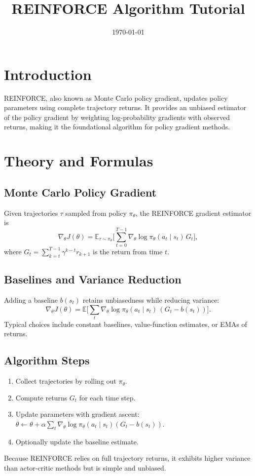 ﻿\documentclass[12pt]{article}
\title{REINFORCE Algorithm Tutorial}
\author{}
\date{\today}
\begin{document}
\maketitle

\section{Introduction}
REINFORCE, also known as Monte Carlo policy gradient, updates policy parameters using complete trajectory returns. It provides an unbiased estimator of the policy gradient by weighting log-probability gradients with observed returns, making it the foundational algorithm for policy gradient methods.

\section{Theory and Formulas}
\subsection{Monte Carlo Policy Gradient}
Given trajectories \(\tau\) sampled from policy \(\pi_\theta\), the REINFORCE gradient estimator is
\begin{equation}
\nabla_\theta J(\theta) = \mathbb{E}_{\tau \sim \pi_\theta}\Big[ \sum_{t=0}^{T-1} \nabla_\theta \log \pi_\theta(a_t\mid s_t)\, G_t \Big],
\end{equation}
where \(G_t = \sum_{k=t}^{T-1} \gamma^{k-t} r_{k+1}\) is the return from time \(t\).

\subsection{Baselines and Variance Reduction}
Adding a baseline \(b(s_t)\) retains unbiasedness while reducing variance:
\begin{equation}
\nabla_\theta J(\theta) = \mathbb{E}\Big[ \sum_{t} \nabla_\theta \log \pi_\theta(a_t\mid s_t)\, (G_t - b(s_t)) \Big].
\end{equation}
Typical choices include constant baselines, value-function estimates, or EMAs of returns.

\subsection{Algorithm Steps}
\begin{enumerate}
  \item Collect trajectories by rolling out \(\pi_\theta\).
  \item Compute returns \(G_t\) for each time step.
  \item Update parameters with gradient ascent: \(\theta \leftarrow \theta + \alpha \sum_t \nabla_\theta \log \pi_\theta(a_t\mid s_t) (G_t - b(s_t))\).
  \item Optionally update the baseline estimate.
\end{enumerate}
Because REINFORCE relies on full trajectory returns, it exhibits higher variance than actor-critic methods but is simple and unbiased.
\end{document}
